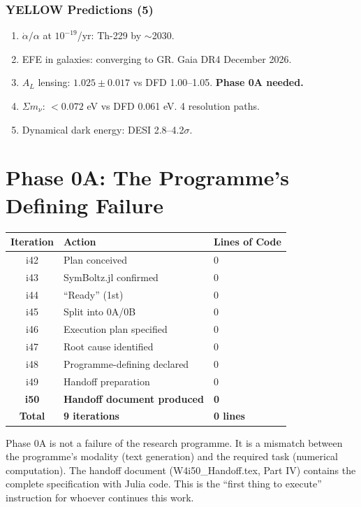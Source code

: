 \documentclass[11pt,a4paper]{article}
\begin{document}
\section{YELLOW Predictions (5)}

\begin{enumerate}
\item $\dot{\alpha}/\alpha$ at $10^{-19}$/yr: Th-229 by $\sim$2030.
\item EFE in galaxies: converging to GR. Gaia DR4 December 2026.
\item $A_L$ lensing: $1.025 \pm 0.017$ vs DFD 1.00--1.05. \textbf{Phase 0A needed.}
\item $\Sigma m_\nu$: $< 0.072$ eV vs DFD 0.061 eV. 4 resolution paths.
\item Dynamical dark energy: DESI 2.8--4.2$\sigma$.
\end{enumerate}


\part{Phase 0A: The Programme's Defining Failure}

\begin{center}
\begin{tabular}{cll}
\toprule
\textbf{Iteration} & \textbf{Action} & \textbf{Lines of Code} \\
\midrule
i42 & Plan conceived & 0 \\
i43 & SymBoltz.jl confirmed & 0 \\
i44 & ``Ready'' (1st) & 0 \\
i45 & Split into 0A/0B & 0 \\
i46 & Execution plan specified & 0 \\
i47 & Root cause identified & 0 \\
i48 & Programme-defining declared & 0 \\
i49 & Handoff preparation & 0 \\
\textbf{i50} & \textbf{Handoff document produced} & \textbf{0} \\
\midrule
\textbf{Total} & \textbf{9 iterations} & \textbf{0 lines} \\
\bottomrule
\end{tabular}
\end{center}

Phase 0A is not a failure of the research programme. It is a mismatch between the programme's modality (text generation) and the required task (numerical computation). The handoff document (W4i50\_Handoff.tex, Part IV) contains the complete specification with Julia code. This is the ``first thing to execute'' instruction for whoever continues this work.
\end{document}
